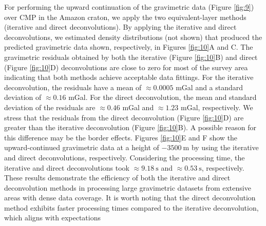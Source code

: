 For performing the upward continuation of the gravimetric data (Figure \ref{fig:9}) over CMP in the Amazon craton, we apply the two equivalent-layer methods (iterative and direct deconvolutions).
By applying the iterative and direct deconvolutions, we estimated density distributions (not shown)
that produced the predicted gravimetric data shown, respectively, in  Figures \ref{fig:10}A and C.
The gravimetric residuals obtained by  both the iterative (Figure \ref{fig:10}B) and
direct (Figure \ref{fig:10}D) deconvolutions are close to zero for most of the survey area
indicating that both methods achieve acceptable data fittings.
For the iterative deconvolution, the residuals have a mean of $\approx 0.0005$ mGal and a standard deviation 
of $\approx 0.16$ mGal.
For the direct deconvolution, the mean and standard deviation of the residuals are $\approx 0.46$ mGal and 
$\approx 1.23$ mGal, respectively. 
We stress that the residuals from the direct deconvolution (Figure \ref{fig:10}D) are greater than  
the iterative deconvolution (Figure \ref{fig:10}B).
A possible reason for this difference may be  the border effects.
Figures \ref{fig:10}E and F show the upward-continued gravimetric data at a height of $-3500 \: \mathrm{m}$
by using the iterative and direct deconvolutions, respectively.
Considering the processing time, the iterative and direct deconvolutions took  $\approx 9.18 \: \mathrm{s}$ and $\approx 0.53 \: \mathrm{s}$, respectively. 
These results demonstrate the efficiency of both the iterative and direct deconvolution methods in processing large gravimetric datasets from extensive areas with dense data coverage. 
It is worth noting that the direct deconvolution method exhibits faster processing times compared to the iterative deconvolution, which aligns with expectations





